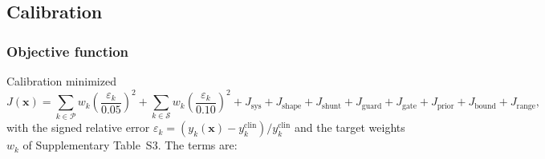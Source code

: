 \FloatBarrier
\subsection{Calibration}
\label{sec:calibration}

\subsubsection{Objective function}
Calibration minimized
\begin{equation}
J(\mathbf{x}) = \sum_{k \in \mathcal{P}} w_k\left(\frac{\varepsilon_k}{0.05}\right)^{2}
+ \sum_{k \in \mathcal{S}} w_k\left(\frac{\varepsilon_k}{0.10}\right)^{2}
+ J_{\mathrm{sys}} + J_{\mathrm{shape}} + J_{\mathrm{shunt}} + J_{\mathrm{guard}}
+ J_{\mathrm{gate}} + J_{\mathrm{prior}} + J_{\mathrm{bound}} + J_{\mathrm{range}},
\label{eq:objective}
\end{equation}
with the signed relative error $\varepsilon_k = (y_k(\mathbf{x}) - y_k^{\mathrm{clin}})/y_k^{\mathrm{clin}}$ and the target weights $w_k$ of Supplementary Table~S3. The terms are:
